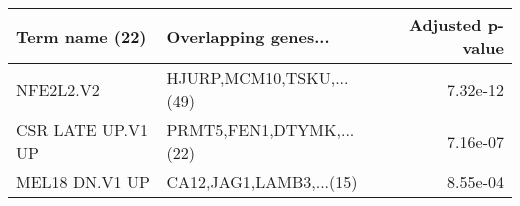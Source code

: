 \begin{tabular}{llr}
\toprule
   Term name (22) &     Overlapping genes... &  Adjusted p-value \\
\midrule
        NFE2L2.V2 & HJURP,MCM10,TSKU,...(49) &          7.32e-12 \\
CSR LATE UP.V1 UP & PRMT5,FEN1,DTYMK,...(22) &          7.16e-07 \\
   MEL18 DN.V1 UP &  CA12,JAG1,LAMB3,...(15) &          8.55e-04 \\
\bottomrule
\end{tabular}
